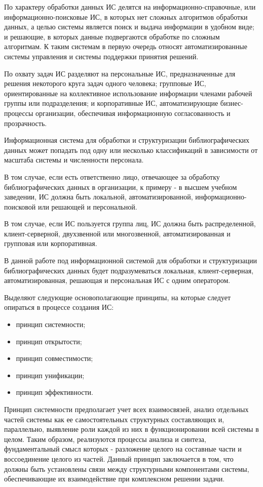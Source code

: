 По характеру обработки данных ИС делятся на информационно-справочные, или информационно-поисковые ИС, в которых нет сложных алгоритмов обработки данных, а целью системы является поиск и выдача информации в удобном виде; и решающие, в которых данные подвергаются обработке по сложным алгоритмам. К таким системам в первую очередь относят автоматизированные системы управления и системы поддержки принятия решений.

По охвату задач ИС разделяют на персональные ИС, предназначенные для решения некоторого круга задач одного человека; групповые ИС, ориентированные на коллективное использование информации членами рабочей группы или подразделения; и корпоративные ИС, автоматизирующие бизнес-процессы организации, обеспечивая информационную согласованность и прозрачность.

Информационная система для обработки и структуризации библиографических данных может попадать под одну или несколько классификаций в зависимости от масштаба системы и численности персонала.

В том случае, если есть ответственно лицо, отвечающее за обработку библиографических данных в организации, к примеру - в высшем учебном заведении, ИС должна быть локальной, автоматизированной, информационно-поисковой или решающей и персональной.

В том случае, если ИС пользуется группа лиц, ИС должна быть распределенной, клиент-серверной, двухзвенной или многозвенной, автоматизированная и групповая или корпоративная.

В данной работе под информационной системой для обработки и структуризации библиографических данных будет подразумеваться локальная, клиент-серверная, автоматизированная, решающая и персональная ИС с одним оператором. 

Выделяют следующие основополагающие принципы, на которые следует опираться в процессе создания ИС:

\begin{itemize}
	\item принцип системности;
	\item принцип открытости;
	\item принцип совместимости;
	\item принцип унификации;
	\item принцип эффективности.
\end{itemize}

Принцип системности предполагает учет всех взаимосвязей, анализ отдельных частей системы как ее самостоятельных структурных составляющих и, параллельно, выявление роли каждой из них в функционировании всей системы в целом. Таким образом, реализуются процессы анализа и синтеза, фундаментальный смысл которых - разложение целого на составные части и воссоединение целого из частей. Данный принцип заключается в том, что должны быть установлены связи между структурными компонентами системы, обеспечивающие их взаимодействие при комплексном решении задачи.

